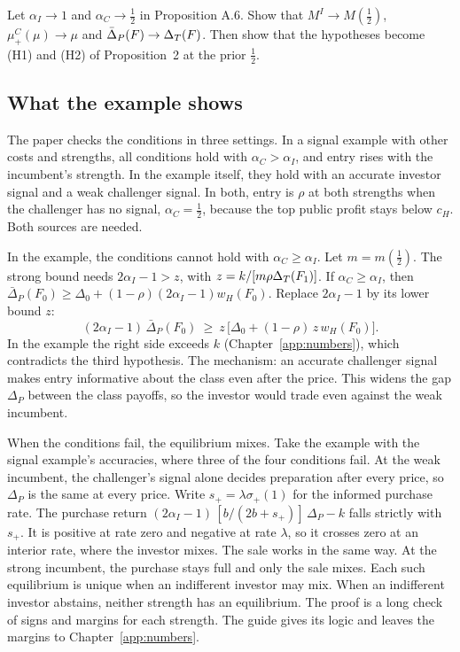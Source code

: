 \begin{checkyourself}
Let \(\alpha_I\to1\) and \(\alpha_C\to\tfrac12\) in Proposition A.6. Show that \(M^I\to M(\tfrac12)\), \(\mu^C_+(\mu)\to\mu\) and \(\bar\Delta_P(F)\to\Delta_T(F)\). Then show that the hypotheses become (H1) and (H2) of Proposition~2 at the prior \(\tfrac12\).
\label{q:robustness-limit}
\end{checkyourself}

\subsection{What the example shows}

The paper checks the conditions in three settings.
In a signal example with other costs and strengths, all conditions hold with \(\alpha_C>\alpha_I\), and entry rises with the incumbent's strength.
In the example itself, they hold with an accurate investor signal and a weak challenger signal.
In both, entry is \(\rho\) at both strengths when the challenger has no signal, \(\alpha_C=\tfrac12\), because the top public profit stays below \(c_H\). Both sources are needed.

In the example, the conditions cannot hold with \(\alpha_C\ge\alpha_I\).
Let \(m=m(\tfrac12)\).
The strong bound needs \(2\alpha_I-1>z\), with \(z=k/[m\rho\Delta_T(F_1)]\).
If \(\alpha_C\ge\alpha_I\), then \(\bar\Delta_P(F_0)\ge\Delta_0+(1-\rho)(2\alpha_I-1)w_H(F_0)\). Replace \(2\alpha_I-1\) by its lower bound \(z\):
\[
(2\alpha_I-1)\,\bar\Delta_P(F_0)\ \ge\ z\,\bigl[\Delta_0+(1-\rho)\,z\,w_H(F_0)\bigr].
\]
In the example the right side exceeds \(k\) (Chapter~\ref{app:numbers}), which contradicts the third hypothesis.
The mechanism: an accurate challenger signal makes entry informative about the class even after the price. This widens the gap \(\Delta_P\) between the class payoffs, so the investor would trade even against the weak incumbent.

When the conditions fail, the equilibrium mixes.
Take the example with the signal example's accuracies, where three of the four conditions fail.
At the weak incumbent, the challenger's signal alone decides preparation after every price, so \(\Delta_P\) is the same at every price.
Write \(s_+=\lambda\sigma_+(1)\) for the informed purchase rate.
The purchase return \((2\alpha_I-1)\,[b/(2b+s_+)]\,\Delta_P-k\) falls strictly with \(s_+\).
It is positive at rate zero and negative at rate \(\lambda\), so it crosses zero at an interior rate, where the investor mixes. The sale works in the same way.
At the strong incumbent, the purchase stays full and only the sale mixes.
Each such equilibrium is unique when an indifferent investor may mix. When an indifferent investor abstains, neither strength has an equilibrium.
The proof is a long check of signs and margins for each strength. The guide gives its logic and leaves the margins to Chapter~\ref{app:numbers}.

